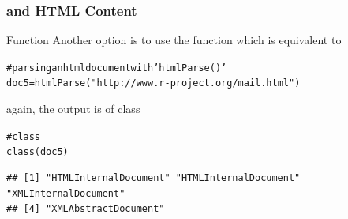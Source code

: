 \documentclass{beamer}\usepackage[]{graphicx}\usepackage[]{color}
\makeatletter
\newcommand{\hlstr}[1]{\textcolor[rgb]{0.063,0.58,0.627}{#1}}%
\newcommand{\hlcom}[1]{\textcolor[rgb]{0.588,0.588,0.588}{#1}}%
\newcommand{\hlstd}[1]{\textcolor[rgb]{0.196,0.196,0.196}{#1}}%
\newcommand{\hlkwb}[1]{\textcolor[rgb]{0.627,0,0.314}{#1}}%
\newcommand{\hlkwd}[1]{\textcolor[rgb]{0.78,0.227,0.412}{#1}}%
\newenvironment{kframe}{%
 \def\at@end@of@kframe{}%
 \ifinner\ifhmode%
  \def\at@end@of@kframe{\end{minipage}}%
  \begin{minipage}{\columnwidth}%
 \fi\fi%
 \def\FrameCommand##1{\hskip\@totalleftmargin \hskip-\fboxsep
 \colorbox{shadecolor}{##1}\hskip-\fboxsep
     \hskip-\linewidth \hskip-\@totalleftmargin \hskip\columnwidth}%
 \MakeFramed {\advance\hsize-\width
   \@totalleftmargin\z@ \linewidth\hsize
   \@setminipage}}%
 {\par\unskip\endMakeFramed%
 \at@end@of@kframe}
\newenvironment{knitrout}{}{} %
\makeatother
\begin{document}
\begin{frame}[fragile]
\frametitle{ and HTML Content}

\begin{block}{Function }
Another option is to use the function  which is equivalent to 

\begin{knitrout}\tiny
{}\color{fgcolor}\begin{kframe}
\begin{alltt}
\hlcom{# parsing an html document with 'htmlParse()'}
\hlstd{doc5} \hlkwb{=} \hlkwd{htmlParse}\hlstd{(}\hlstr{"http://www.r-project.org/mail.html"}\hlstd{)}
\end{alltt}
\end{kframe}
\end{knitrout}

again, the output is of class 

\begin{knitrout}\tiny
{}\color{fgcolor}\begin{kframe}
\begin{alltt}
\hlcom{# class }
\hlkwd{class}\hlstd{(doc5)}
\end{alltt}
\begin{verbatim}
## [1] "HTMLInternalDocument" "HTMLInternalDocument" "XMLInternalDocument" 
## [4] "XMLAbstractDocument"
\end{verbatim}
\end{kframe}
\end{knitrout}
\end{block}

\end{frame}

\end{document}
